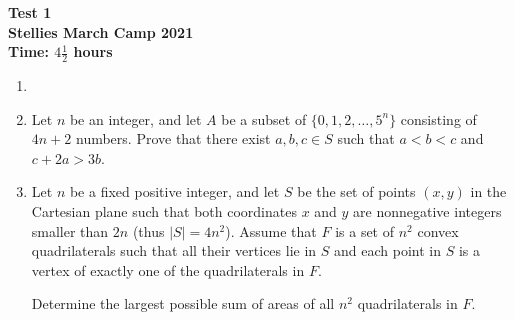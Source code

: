\documentclass{article}
\begin{document}
\thispagestyle{empty}

\begin{center}
  \textbf{\Large Test 1}
  \\ \vspace{1em}
  \textbf{\large Stellies March Camp 2021}
  \\ \vspace{1em}
  \textbf{\large Time: $4\frac{1}{2}$ hours}
\end{center}

\vspace{24pt}

\begin{enumerate}[itemsep=12pt]

\item %


\item %
Let $n$ be an integer, and let $A$ be a subset of $\{0, 1, 2, \dotsc, 5^n\}$ consisting of $4n+2$ numbers.
Prove that there exist $a, b, c \in S$ such that $a < b < c$ and $c +2a > 3b$.

\item %
Let $n$ be a fixed positive integer, and let $S$ be the set of points $(x,y)$ in the Cartesian plane such that both coordinates $x$ and $y$ are nonnegative integers smaller than $2n$ (thus $|S| = 4n^2$).
Assume that $F$ is a set of $n^2$ convex quadrilaterals such that all their vertices lie in $S$ and each point in $S$ is a vertex of exactly one of the quadrilaterals in $F$.

Determine the largest possible sum of areas of all $n^2$ quadrilaterals in $F$.

\end{enumerate}

\vfill
\centering
\begin{BVerbatim}
\end{BVerbatim}
\end{document}
